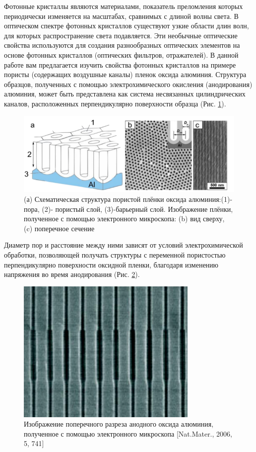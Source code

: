\documentclass[a4paper, 12pt]{article}
\begin{document}
Фотонные кристаллы являются материалами, показатель преломления которых периодически изменяется на масштабах, сравнимых с длиной волны света. В оптическом спектре фотонных кристаллов существуют узкие области длин волн, для которых распространение света подавляется. Эти необычные оптические свойства используются для создания разнообразных оптических элементов на основе фотонных кристаллов (оптических фильтров, отражателей).
В данной работе вам предлагается изучить свойства фотонных кристаллов на примере пористы (содержащих воздушные каналы) пленок оксида алюминия. Структура образцов, полученных с помощью электрохимического окисления (анодирования) алюминия, может быть представлена как система несвязанных цилиндрических каналов, расположенных перпендикулярно поверхности образца (Рис. \ref{im:1}).


\begin{figure}[H]
	\centering
	\includegraphics[scale=0.7]{1}
	\caption{ (а) Схематическая структура пористой плёнки оксида алюминия:(1)-пора, (2)-
пористый слой, (3)-барьерный слой. Изображение плёнки, полученное с помощью электронного
микроскопа: (b) вид сверху, (c) поперечное сечение}
	\label{im:1}
\end{figure}

Диаметр пор и расстояние между ними зависят от условий электрохимической обработки, позволяющей получать структуры с переменной пористостью перпендикулярно поверхности оксидной пленки, благодаря изменению напряжения во время анодирования (Рис. \ref{im:3}).

\begin{figure}[H]
	\centering
	\includegraphics[scale=0.8]{3}
	\caption{Изображение поперечного разреза анодного оксида алюминия, полученное с
помощью электронного микроскопа [Nat.Mater., 2006, 5, 741]}
	\label{im:3}
\end{figure}
\end{document}

